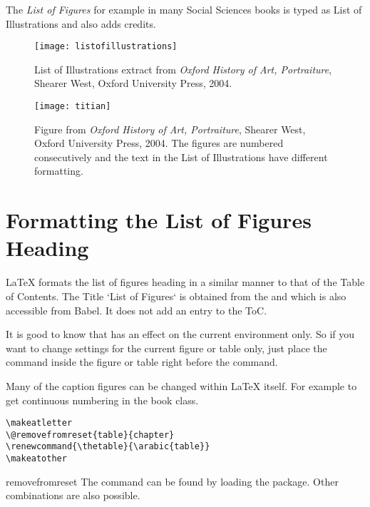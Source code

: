 \begin{macro}{\listfigurename}
The \textit{List of Figures} for example in many Social Sciences books is typed as {List of Illustrations} and also adds credits.
\end{macro}




\begin{figure}[htp]
\texttt{[image: listofillustrations]}
\caption{List of Illustrations extract from \textit{Oxford History of Art, Portraiture}, Shearer West, Oxford University Press, 2004.}
\end{figure}
\begin{figure}[htp]
\texttt{[image: titian]}
\centering
\caption{Figure from \textit{Oxford History of Art, Portraiture}, Shearer West, Oxford University Press, 2004. The figures are numbered consecutively and the text in the List of Illustrations have different formatting.}
\end{figure}

\section{Formatting the List of Figures Heading}

LaTeX formats the list of figures heading in a similar manner to that of the Table of Contents. The Title `List of Figures` is obtained from the  and which is also accessible from Babel. It does not add an entry to the ToC.



It is good to know that  has an effect on the current environment only.
So if you want to change settings for the current figure or table only, just place the
 command inside the figure or table right before the 
command.


Many of the caption figures can be changed within LaTeX itself. For example to get continuous numbering in the book class.

\begin{tcolorbox}
\begin{lstlisting}
\makeatletter
\@removefromreset{table}{chapter}
\renewcommand{\thetable}{\arabic{table}}
\makeatother
\end{lstlisting}
\end{tcolorbox}

\begin{macro}{removefromreset}
The command  can be found by loading the  package. Other combinations are also possible.
\end{macro}

